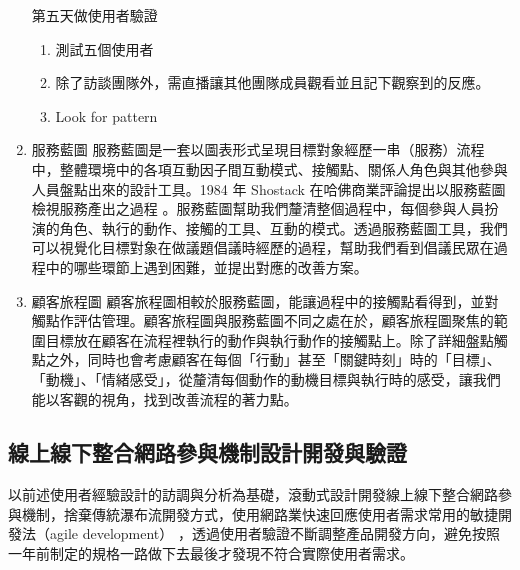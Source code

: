 \documentclass[12pt,a4paper]{article}
\begin{document}
\begin{enumerate}
第五天做使用者驗證
\begin{enumerate}
\item 測試五個使用者
\item 除了訪談團隊外，需直播讓其他團隊成員觀看並且記下觀察到的反應。
\item Look for pattern
\end{enumerate}
\item 服務藍圖
\label{sec:orgd22ff10}
服務藍圖是一套以圖表形式呈現目標對象經歷一串（服務）流程中，整體環境中的各項互動因子間互動模式、接觸點、關係人角色與其他參與人員盤點出來的設計工具。1984 年 Shostack 在哈佛商業評論提出以服務藍圖檢視服務產出之過程 \citep{shostack1984} 。服務藍圖幫助我們釐清整個過程中，每個參與人員扮演的角色、執行的動作、接觸的工具、互動的模式。透過服務藍圖工具，我們可以視覺化目標對象在做議題倡議時經歷的過程，幫助我們看到倡議民眾在過程中的哪些環節上遇到困難，並提出對應的改善方案。
\item 顧客旅程圖
\label{sec:org3ffb2e3}
顧客旅程圖相較於服務藍圖，能讓過程中的接觸點看得到，並對觸點作評估管理。顧客旅程圖與服務藍圖不同之處在於，顧客旅程圖聚焦的範圍目標放在顧客在流程裡執行的動作與執行動作的接觸點上。除了詳細盤點觸點之外，同時也會考慮顧客在每個「行動」甚至「關鍵時刻」時的「目標」、「動機」、「情緒感受」，從釐清每個動作的動機目標與執行時的感受，讓我們能以客觀的視角，找到改善流程的著力點。
\end{enumerate}

\subsection{線上線下整合網路參與機制設計開發與驗證 }
\label{sec:orgb1ca101}
以前述使用者經驗設計的訪調與分析為基礎，滾動式設計開發線上線下整合網路參與機制，捨棄傳統瀑布流開發方式，使用網路業快速回應使用者需求常用的敏捷開發法（agile development） \cite{agile_development} ，透過使用者驗證不斷調整產品開發方向，避免按照一年前制定的規格一路做下去最後才發現不符合實際使用者需求。
\end{document}
